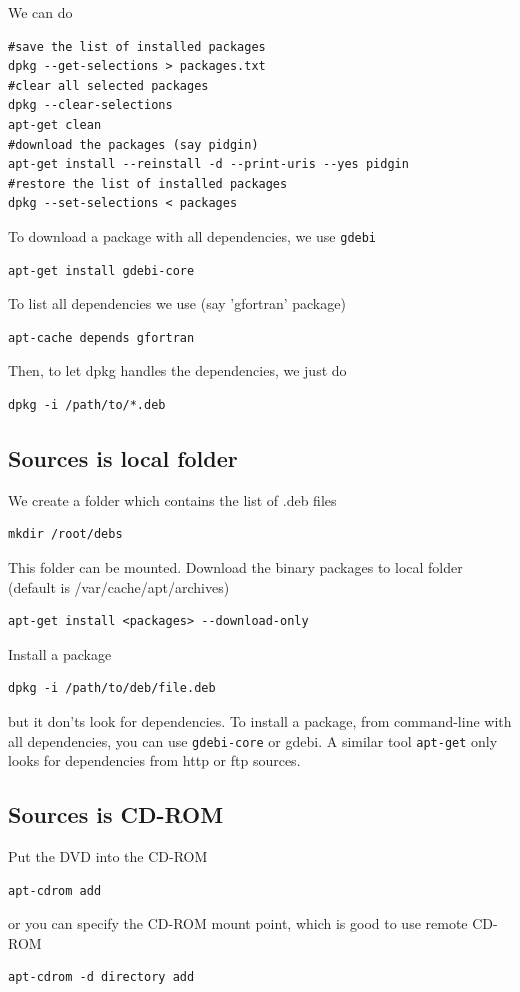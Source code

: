 We can do
\begin{verbatim}
#save the list of installed packages
dpkg --get-selections > packages.txt
#clear all selected packages
dpkg --clear-selections
apt-get clean
#download the packages (say pidgin)
apt-get install --reinstall -d --print-uris --yes pidgin
#restore the list of installed packages
dpkg --set-selections < packages
\end{verbatim}

To download a package with all dependencies, we use \verb!gdebi!
\begin{verbatim}
apt-get install gdebi-core
\end{verbatim}
To list all dependencies we use (say 'gfortran' package)
\begin{verbatim}
apt-cache depends gfortran
\end{verbatim}
Then, to let dpkg handles the dependencies, we just do
\begin{verbatim}
dpkg -i /path/to/*.deb
\end{verbatim}


\subsection{Sources is local folder}

We create a folder which contains the list of .deb files
\begin{verbatim}
mkdir /root/debs
\end{verbatim}
This folder can be mounted. Download the binary packages to local folder
(default is /var/cache/apt/archives)
\begin{verbatim}
apt-get install <packages> --download-only
\end{verbatim}

Install a package
\begin{verbatim}
dpkg -i /path/to/deb/file.deb
\end{verbatim}
but it don'ts look for dependencies. To install a package, from command-line
with all dependencies, you can use \verb!gdebi-core! or gdebi. A similar tool
\verb!apt-get! only looks for dependencies from http or ftp sources. 

\subsection{Sources is CD-ROM}

Put the DVD into the CD-ROM
\begin{verbatim}
apt-cdrom add
\end{verbatim}
or you can specify the CD-ROM mount point, which is good to use remote CD-ROM
\begin{verbatim}
apt-cdrom -d directory add 
\end{verbatim}

